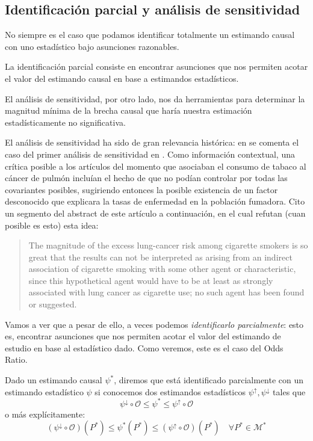 \subsection{Identificación parcial y análisis de sensitividad}
No siempre es el caso que podamos identificar totalmente un estimando causal con uno estadístico bajo
asunciones razonables.

La identificación parcial consiste en encontrar asunciones que nos permiten acotar el valor del estimando
causal en base a estimandos estadísticos.

El análisis de sensitividad, por otro lado, nos da herramientas para determinar la magnitud
mínima de la brecha causal que haría nuestra estimación estadísticamente no significativa.

\begin{nota}
	El análisis de sensitividad ha sido de gran relevancia histórica: en \cite[5: Sensitivity to Unmeasured Covariates]{rosenbaumCausalInference2023}
	se comenta el caso del primer análisis de sensitividad en \cite{cornfield1959}. %
	Como información contextual, una crítica posible a los artículos del momento que asociaban el consumo de tabaco
	al cáncer de pulmón incluían el hecho de que no podían controlar
	por todas las covariantes posibles, sugiriendo entonces la posible existencia de
	un factor desconocido que explicara la tasas de enfermedad en la población fumadora.
	Cito un segmento del abstract de este artículo a continuación, en el cual refutan (cuan posible es esto) esta idea:
	\begin{quotation}
		The magnitude of the excess lung-cancer risk among cigarette smokers is so great that
		the results can not be interpreted as arising from an indirect association of cigarette
		smoking with some other agent or characteristic, since this hypothetical agent would have
		to be at least as strongly associated with lung cancer as cigarette use; no such agent has
		been found or suggested.
	\end{quotation}
\end{nota}

Vamos a ver que a pesar de ello, a veces podemos \textit{identificarlo parcialmente}: esto es,
encontrar asunciones que nos permiten acotar el valor del estimando de estudio en base al
estadístico dado.
Como veremos, este es el caso del Odds Ratio.

\begin{definicion} \cite[sección 2.3]{mci}
	Dado un estimando causal $\psi^*$, diremos que está identificado parcialmente
	con un estimando estadístico $\psi$ si conocemos
	dos estimandos estadísticos $\psi^{\uparrow}, \psi^{\downarrow}$ tales que
	$$
		\psi^{\downarrow} \circ \mathcal{O} \leq \psi^* \leq \psi^{\uparrow} \circ \mathcal{O}
	$$
	o más explícitamente:
	$$
		(\psi^{\downarrow} \circ \mathcal{O})(P^*) \leq \psi^*(P^*) \leq (\psi^{\uparrow} \circ \mathcal{O})(P^*) \quad \forall P^* \in \mathcal{M}^*
	$$

\end{definicion}


